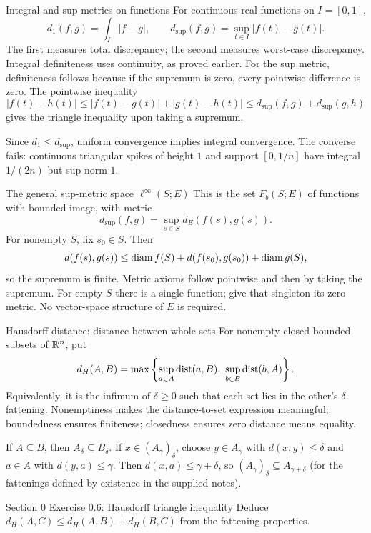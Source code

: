 \begin{note}{Integral and sup metrics on functions}
For continuous real functions on $I=[0,1]$,
\[d_1(f,g)=\int_I|f-g|,\qquad d_{\sup}(f,g)=\sup_{t\in I}|f(t)-g(t)|.\]
The first measures total discrepancy; the second measures worst-case discrepancy. Integral definiteness uses continuity, as proved earlier. For the sup metric, definiteness follows because if the supremum is zero, every pointwise difference is zero. The pointwise inequality
\[|f(t)-h(t)|\le|f(t)-g(t)|+|g(t)-h(t)|\le d_{\sup}(f,g)+d_{\sup}(g,h)\]
gives the triangle inequality upon taking a supremum.

Since $d_1\le d_{\sup}$, uniform convergence implies integral convergence. The converse fails: continuous triangular spikes of height $1$ and support $[0,1/n]$ have integral $1/(2n)$ but sup norm $1$.
\end{note}
\begin{note}{The general sup-metric space $\ell^\infty(S;E)$}
This is the set $F_b(S;E)$ of functions with bounded image, with metric
\[d_{\sup}(f,g)=\sup_{s\in S}d_E(f(s),g(s)).\]
For nonempty $S$, fix $s_0\in S$. Then
\[d(f(s),g(s))\le\operatorname{diam} f(S)+d(f(s_0),g(s_0))+\operatorname{diam} g(S),\]
so the supremum is finite. Metric axioms follow pointwise and then by taking the supremum. For empty $S$ there is a single function; give that singleton its zero metric. No vector-space structure of $E$ is required.
\end{note}
\begin{note}{Hausdorff distance: distance between whole sets}
For nonempty closed bounded subsets of $\mathbb R^n$, put
\[d_H(A,B)=\max\left\{\sup_{a\in A}\dist(a,B),\ \sup_{b\in B}\dist(b,A)\right\}.\]
Equivalently, it is the infimum of $\delta\ge0$ such that each set lies in the other's $\delta$-fattening. Nonemptiness makes the distance-to-set expression meaningful; boundedness ensures finiteness; closedness ensures zero distance means equality.

If $A\subseteq B$, then $A_\delta\subseteq B_\delta$. If $x\in(A_\gamma)_\delta$, choose $y\in A_\gamma$ with $d(x,y)\le\delta$ and $a\in A$ with $d(y,a)\le\gamma$. Then $d(x,a)\le\gamma+\delta$, so $(A_\gamma)_\delta\subseteq A_{\gamma+\delta}$ (for the fattenings defined by existence in the supplied notes).
\end{note}
\begin{exam}{Section 0 Exercise 0.6: Hausdorff triangle inequality}
Deduce $d_H(A,C)\le d_H(A,B)+d_H(B,C)$ from the fattening properties.
\end{exam}

